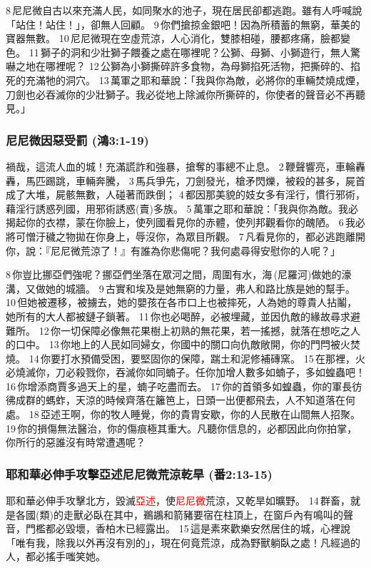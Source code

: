 8 尼尼微自古以來充滿人民，如同聚水的池子，現在居民卻都逃跑。雖有人呼喊說「站住！站住！」，卻無人回顧。 9 你們搶掠金銀吧！因為所積蓄的無窮，華美的寶器無數。 10 尼尼微現在空虛荒涼，人心消化，雙膝相碰，腰都疼痛，臉都變色。 11 獅子的洞和少壯獅子餵養之處在哪裡呢？公獅、母獅、小獅遊行，無人驚嚇之地在哪裡呢？ 12 公獅為小獅撕碎許多食物，為母獅掐死活物，把撕碎的、掐死的充滿牠的洞穴。 13 萬軍之耶和華說：「我與你為敵，必將你的車輛焚燒成煙，刀劍也必吞滅你的少壯獅子。我必從地上除滅你所撕碎的，你使者的聲音必不再聽見。」

\subsubsection{尼尼微因惡受罰 (鴻3:1-19)}
禍哉，這流人血的城！充滿謊詐和強暴，搶奪的事總不止息。 2 鞭聲響亮，車輪轟轟，馬匹踢跳，車輛奔騰， 3 馬兵爭先，刀劍發光，槍矛閃爍，被殺的甚多，屍首成了大堆，屍骸無數，人碰著而跌倒； 4 都因那美貌的妓女多有淫行，慣行邪術，藉淫行誘惑列國，用邪術誘惑(賣)多族。 5 萬軍之耶和華說：「我與你為敵。我必揭起你的衣襟，蒙在你臉上，使列國看見你的赤體，使列邦觀看你的醜陋。 6 我必將可憎汙穢之物拋在你身上，辱沒你，為眾目所觀。 7 凡看見你的，都必逃跑離開你，說：『尼尼微荒涼了！』有誰為你悲傷呢？我何處尋得安慰你的人呢？」

8 你豈比挪亞們強呢？挪亞們坐落在眾河之間，周圍有水，海 (尼羅河)做她的濠溝，又做她的城牆。 9 古實和埃及是她無窮的力量，弗人和路比族是她的幫手。 10 但她被遷移，被擄去，她的嬰孩在各市口上也被摔死，人為她的尊貴人拈鬮，她所有的大人都被鏈子鎖著。 11 你也必喝醉，必被埋藏，並因仇敵的緣故尋求避難所。 12 你一切保障必像無花果樹上初熟的無花果，若一搖撼，就落在想吃之人的口中。 13 你地上的人民如同婦女，你國中的關口向仇敵敞開，你的門閂被火焚燒。 14 你要打水預備受困，要堅固你的保障，踹土和泥修補磚窯。 15 在那裡，火必燒滅你，刀必殺戮你，吞滅你如同蝻子。任你加增人數多如蝻子，多如蝗蟲吧！ 16 你增添商賈多過天上的星，蝻子吃盡而去。 17 你的首領多如蝗蟲，你的軍長彷彿成群的螞蚱，天涼的時候齊落在籬笆上，日頭一出便都飛去，人不知道落在何處。 18 亞述王啊，你的牧人睡覺，你的貴胄安歇，你的人民散在山間無人招聚。 19 你的損傷無法醫治，你的傷痕極其重大。凡聽你信息的，必都因此向你拍掌，你所行的惡誰沒有時常遭遇呢？


\subsubsection{耶和華必伸手攻擊亞述尼尼微荒涼乾旱 (番2:13-15)}
耶和華必伸手攻擊北方，毀滅\textcolor{red}{亞述}，使\textcolor{red}{尼尼微}荒涼，又乾旱如曠野。 14 群畜，就是各國(類)的走獸必臥在其中，鵜鶘和箭豬要宿在柱頂上，在窗戶內有鳴叫的聲音，門檻都必毀壞，香柏木已經露出。 15 這是素來歡樂安然居住的城，心裡說「唯有我，除我以外再沒有別的」，現在何竟荒涼，成為野獸躺臥之處！凡經過的人，都必搖手嗤笑她。




